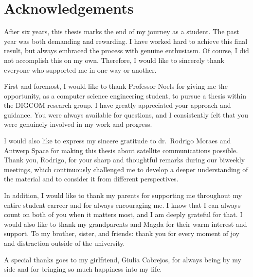 \cleardoublepage
\chapter*{Acknowledgements}

After six years, this thesis marks the end of my journey as a student.
The past year was both demanding and rewarding.
I have worked hard to achieve this final result, but always embraced the process with genuine enthusiasm.
Of course, I did not accomplish this on my own. Therefore, I would like to sincerely thank everyone who supported me in one way or another.

First and foremost, I would like to thank Professor Noels for giving me the opportunity, as a computer science engineering student, to pursue a thesis within the \textsc{DIGCOM} research group.
I have greatly appreciated your approach and guidance. You were always available for questions, and I consistently felt that you were genuinely involved in my work and progress.

I would also like to express my sincere gratitude to dr.\ Rodrigo Moraes and Antwerp Space for making this thesis about satellite communications possible.
Thank you, Rodrigo, for your sharp and thoughtful remarks during our biweekly meetings, which continuously challenged me to develop a deeper understanding of the material and to consider it from different perspectives.

In addition, I would like to thank my parents for supporting me throughout my entire student carreer and for always encouraging me.
I know that I can always count on both of you when it matters most, and I am deeply grateful for that.
I would also like to thank my grandparents and Magda for their warm interest and support.
To my brother, sister, and friends: thank you for every moment of joy and distraction outside of the university.

A special thanks goes to my girlfriend, Giulia Cabrejos, for always being by my side and for bringing so much happiness into my life.

\vspace{1cm}
\rightline{\authorname}
\rightline{\submissiondate}